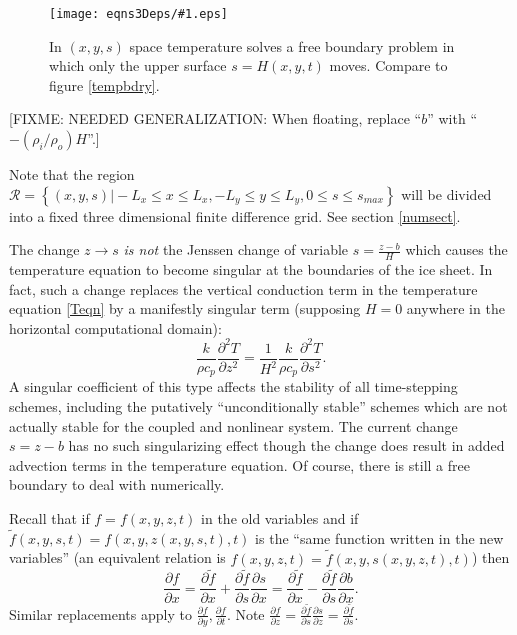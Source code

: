 \documentclass[12pt,final]{amsart}%
\theoremstyle{plain}
\theoremstyle{definition}
\theoremstyle{remark}
\newcommand{\regfigure}[2]{\texttt{[image: eqns3Deps/\#1.eps]}}
\newcommand{\ddt}[1]{\ensuremath{\frac{\partial #1}{\partial t}}}
\newcommand{\ddx}[1]{\ensuremath{\frac{\partial #1}{\partial x}}}
\newcommand{\ddy}[1]{\ensuremath{\frac{\partial #1}{\partial y}}}
\newcommand{\ddz}[1]{\ensuremath{\frac{\partial #1}{\partial z}}}
\newcommand{\dds}[1]{\ensuremath{\frac{\partial #1}{\partial s}}}
\begin{document}
\begin{figure}[ht]
\vspace{-2mm}
\regfigure{stempbdryfig}{3}
\vspace{-4mm}
\caption{In $(x,y,s)$ space temperature solves a free boundary problem in which only the upper surface $s=H(x,y,t)$ moves.  Compare to figure \ref{tempbdry}.}
\label{stempbdry}
\end{figure}

[FIXME: NEEDED GENERALIZATION:  When floating, replace ``$b$'' with ``$-(\rho_i/\rho_o) H$''.]

Note that the region $\mathcal{R}=\left\{(x,y,s)\big| -L_x\le x \le L_x, -L_y\le y \le L_y, 0\le s \le s_{max}\right\}$ will be divided into a fixed three dimensional finite difference grid.  See section \ref{numsect}.

The change $z\to s$ \emph{is not} the Jenssen \citep{Jenssen} change of variable $s=\frac{z-b}{H}$ which causes the temperature equation to become singular at the boundaries of the ice sheet.  In fact, such a change replaces the vertical conduction term in the temperature equation \eqref{Teqn} by a manifestly singular term (supposing $H=0$ anywhere in the horizontal computational domain):
    $$\frac{k}{\rho c_p} \frac{\partial^2 T}{\partial z^2} = \frac{1}{H^2} \frac{k}{\rho c_p} \frac{\partial^2 T}{\partial s^2}.$$
A singular coefficient of this type affects the stability of all time-stepping schemes, including the putatively ``unconditionally stable'' schemes which are not actually stable for the coupled and nonlinear system.  The current change $s=z-b$ has no such singularizing effect though the change does result in added advection terms in the temperature equation.  Of course, there is still a free boundary to deal with numerically.

Recall that if $f=f(x,y,z,t)$ in the old variables and if $\tilde f(x,y,s,t)=f(x,y,z(x,y,s,t),t)$ is the ``same function written in the new variables'' (an equivalent relation is $f(x,y,z,t)=\tilde f(x,y,s(x,y,z,t),t)$) then
    $$\ddx{f} = \ddx{\tilde f}+\dds{\tilde f}\ddx{s} = \ddx{\tilde f}-\dds{\tilde f}\ddx{b}.$$
Similar replacements apply to $\ddy{f},\ddt{f}$. Note $\ddz{f}=\dds{\tilde f} \ddz{s} = \dds{\tilde f}$.
\end{document}
